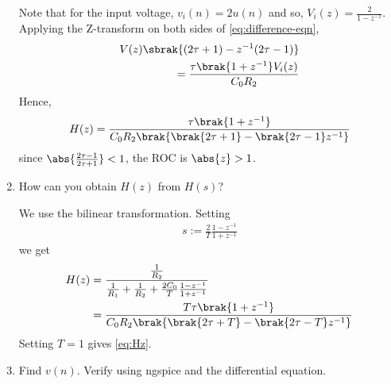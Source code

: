 \documentclass[journal,12pt,twocolumn]{IEEEtran}
\renewcommand\thesection{\arabic{section}}
\begin{document}
\begin{enumerate}[label=\arabic*.,ref=\thesection.\theenumi]
		\solution Note that for the input voltage, $v_i(n) = 2u(n)$ and
		so, $V_i(z) = \frac{2}{1-z^{-1}}$. Applying the Z-transform
		on both sides of \eqref{eq:difference-eqn},
		\begin{align}
			V(z)\sbrak{(2\tau + 1) - z^{-1}(2\tau - 1)} \nonumber \\
			= \frac{\tau\brak{1 + z^{-1}}V_i(z)}{C_0R_2}
		\end{align}
		Hence,
		\begin{align}
			H(z) = \frac{\tau\brak{1+z^{-1}}}{C_0R_2\brak{\brak{2\tau+1}-\brak{2\tau-1}z^{-1}}}
			\label{eq:Hz}
		\end{align}
		since $\abs{\frac{2\tau-1}{2\tau+1}} < 1$, the ROC is $\abs{z} > 1$.
		\item How can you obtain $H(z)$ from $H(s)$?
		
		\solution We use the bilinear transformation. Setting
		\begin{align}
			s := \frac{2}{T}\frac{1 - z^{-1}}{1 + z^{-1}}
		\end{align}
		we get
		\begin{align}
			H(z) &= \frac{\frac{1}{R_2}}{\frac{1}{R_1} + \frac{1}{R_2} + \frac{2C_0}{T}\frac{1 - z^{-1}}{1 + z^{-1}}} \\
			&= \frac{T\tau\brak{1+z^{-1}}}{C_0R_2\brak{\brak{2\tau+T}-\brak{2\tau-T}z^{-1}}}
		\end{align}
		Setting $T = 1$ gives \eqref{eq:Hz}.
		
		\item Find $v(n)$. Verify using ngspice and the differential equation.
		

\end{enumerate}
\end{document}
